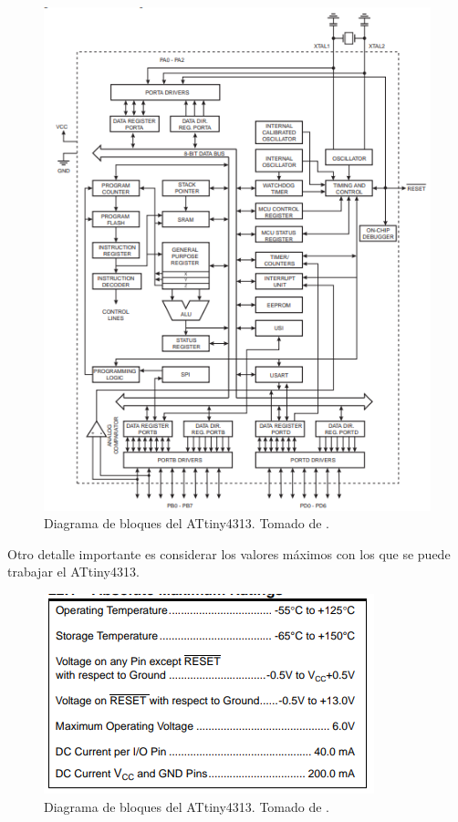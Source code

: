 \begin{figure}[H]
\centering
\includegraphics[width=.7\linewidth]{Imagenes/2.png}
 \caption{Diagrama de bloques del ATtiny4313. Tomado de \cite{web}.}
 \label{fig2}
\end{figure}
Otro detalle importante es considerar los valores máximos con los que se puede trabajar el ATtiny4313.
\begin{figure}[H]
\centering
\includegraphics[width=.5\linewidth]{Imagenes/3.png}
 \caption{Diagrama de bloques del ATtiny4313. Tomado de \cite{web}.}
 \label{fig3}
\end{figure}


